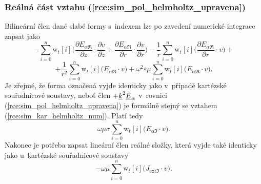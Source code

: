 \subsubsection*{Reálná část vztahu (\ref{rce:sim_pol_helmholtz_upravena})}
Bilineární člen dané slabé formy s~indexem  lze po zavedení numerické integrace zapsat jako
\begin{displaymath}
-\sum_{i=0}^{n}\mathrm{w}_{t}[i]\bigg(\frac{\partial E_{\alpha\Re}}{\partial z}\cdot \frac{\partial v}{\partial z} + \frac{\partial E_{\alpha\Re}}{\partial r}\cdot \frac{\partial v}{\partial r} \bigg) - \frac{1}{r}\sum_{i=0}^{n}\mathrm{w}_{t}[i]\bigg(\frac{\partial E_{\alpha\Re}}{\partial r}\cdot v\bigg) +
\end{displaymath}
\begin{equation}
	 + \frac{1}{r^{2}}\sum_{i=0}^{n}\mathrm{w}_{t}[i]\bigg(E_{\alpha\Re}\cdot v\bigg) + \omega^{2}\varepsilon\mu\sum_{i=0}^{n}\mathrm{w}_{t}[i]\bigg(E_{\alpha\Re}\cdot v\bigg).
	\label{rce:sim_pol_bilinear_real_real} 
\end{equation}
Je zřejmé, že forma označená  vyjde identicky jako v~případě kartézské souřadnicové soustavy, neboť člen $+{\underline{k}}^{2}{\underline{E}}_{\alpha}$ v~rovnici (\ref{rce:sim_pol_helmholtz_upravena}) je formálně stejný se vztahem (\ref{rce:sim_kar_helmholtz_num}). Platí tedy
\begin{equation}
 \omega\mu\sigma\sum_{i=0}^{n}\mathrm{w}_{t}[i]\bigg(E_{\alpha\Im}\cdot v\bigg).
	\label{rce:sim_pol_bilinear_real_imag} 
\end{equation}
Nakonec je potřeba zapsat lineární člen reálné složky, která vyjde také identicky jako u~kartézské souřadnicové soustavy
\begin{equation}
 -\omega\mu\sum_{i=0}^{n}\mathrm{w}_{t}[i]\bigg(J_{\mathrm{ext}\Im}\cdot v\bigg).
	\label{rce:sim_pol_linear_real_num} 
\end{equation}

